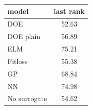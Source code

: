 \begin{tabular}{|lc|}
\hline
model & last rank\\
\hline
DOE & 52.63 \\
DOE plain & 56.89 \\
ELM & 75.21 \\
Fitloss & 55.38 \\
GP & 68.84 \\
NN & 74.98 \\
No surrogate & 54.62 \\
\hline
\end{tabular}
